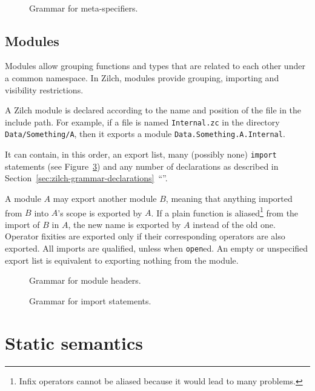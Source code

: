 \begin{figure}[H]
  \centering

  \\

  \caption{Grammar for meta-specifiers.}
  \label{fig:zilch-grammar-declarations-meta-grammar}
\end{figure}

\section{Modules}\label{sec:zilch-grammar-modules}

Modules allow grouping functions and types that are related to each other under a common namespace.
In Zilch, modules provide grouping, importing and visibility restrictions.

A Zilch module is declared according to the name and position of the file in the include path.
For example, if a file is named \verb|Internal.zc| in the directory \verb|Data/Something/A|, then it exports a module \verb|Data.Something.A.Internal|.

It can contain, in this order, an export list, many (possibly none) \texttt{import} statements (see Figure~\ref{fig:zilch-grammar-modules-importgrammar}) and any number of declarations as described in Section~\ref{sec:zilch-grammar-declarations}~``''.

A module $A$ may export another module $B$, meaning that anything imported from $B$ into $A$'s scope is exported by $A$.
If a plain function is aliased\footnote{Infix operators cannot be aliased because it would lead to many problems.} from the import of $B$ in $A$, the new name is exported by $A$ instead of the old one.
Operator fixities are exported only if their corresponding operators are also exported.
All imports are qualified, unless when \verb|open|ed.
An empty or unspecified export list is equivalent to exporting nothing from the module.

\begin{figure}[H]
  \centering


  \caption{Grammar for module headers.}
  \label{fig:zilch-grammar-modules-headergrammar}
\end{figure}

\begin{figure}[H]
  \centering


  \caption{Grammar for import statements.}
  \label{fig:zilch-grammar-modules-importgrammar}
\end{figure}

\chapter{Static semantics}\label{chap:zilch-staticsem}
